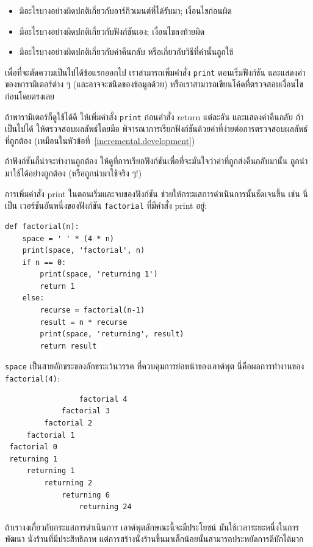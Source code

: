 \begin{itemize}

\item มีอะไรบางอย่างผิดปกติเกี่ยวกับอาร์กิวเมนต์ที่ได้รับมา; เงื่อนไขก่อนผิด

\item มีอะไรบางอย่างผิดปกติเกี่ยวกับฟังก์ชันเอง; เงื่อนไขลงท้ายผิด

\item มีอะไรบางอย่างผิดปกติเกี่ยวกับค่าคืนกลับ หรือเกี่ยวกับวิธีที่ค่านั้นถูกใช้

\end{itemize}

เพื่อที่จะตัดความเป็นไปได้ข้อแรกออกไป เราสามารถเพิ่มคำสั่ง {\tt print} ตอนเริ่มฟังก์ชัน
และแสดงค่าของพารามิเตอร์ต่าง ๆ (และอาจจะชนิดของข้อมูลด้วย) 
หรือเราสามารถเขียนโค้ดที่ตรวจสอบเงื่อนไขก่อนโดยตรงเลย

ถ้าพารามิเตอร์ก็ดูใช้ได้ดี ให้เพิ่มคำสั่ง {\tt print} ก่อนคำสั่ง return แต่ละอัน 
และแสดงค่าคืนกลับ  ถ้าเป็นไปได้ ให้ตรวจสอบผลลัพธ์โดยมือ พิจารณาการเรียกฟังก์ชันด้วยค่าที่ง่ายต่อการตรวจสอบผลลัพธ์ที่ถูกต้อง (เหมือนในหัวข้อที่~\ref{incremental.development})

ถ้าฟังก์ชันก็น่าจะทำงานถูกต้อง ให้ดูที่การเรียกฟังก์ชันเพื่อที่จะมั่นใจว่าค่าที่ถูกส่งคืนกลับมานั้น
ถูกนำมาใช้ได้อย่างถูกต้อง (หรือถูกนำมาใช้จริง ๆ!)

การเพิ่มคำสั่ง print ในตอนเริ่มและจบของฟังก์ชัน ช่วยให้กระแสการดำเนินการนั้นชัดเจนขึ้น เช่น นี่เป็น
เวอร์ชันอันหนึ่งของฟังก์ชัน {\tt factorial} ที่มีคำสั่ง print อยู่:

\begin{verbatim}
def factorial(n):
    space = ' ' * (4 * n)
    print(space, 'factorial', n)
    if n == 0:
        print(space, 'returning 1')
        return 1
    else:
        recurse = factorial(n-1)
        result = n * recurse
        print(space, 'returning', result)
        return result
\end{verbatim}
%
{\tt space} เป็นสายอักขระของอักขระเว้นวรรค ที่ควบคุมการย่อหน้าของเอาต์พุต 
นี่คือผลการทำงานของ {\tt factorial(4)}:

\begin{verbatim}
                 factorial 4
             factorial 3
         factorial 2
     factorial 1
 factorial 0
 returning 1
     returning 1
         returning 2
             returning 6
                 returning 24
\end{verbatim}
%
ถ้าเรางงเกี่ยวกับกระแสการดำเนินการ เอาต์พุตลักษณะนี้จะมีประโยชน์ มันใช้เวลาระยะหนึ่งในการพัฒนา
นั่งร้านที่มีประสิทธิภาพ แต่การสร้างนั่งร้านขึ้นมาเล็กน้อยนั้นสามารถประหยัดการดีบักได้มาก


